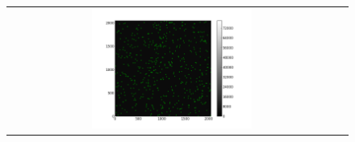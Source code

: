 \documentclass[letterpaper,12pt]{article}
\begin{document}
\begin{figure}[h!]
\begin{tabular}{cc}
                                                                                                                                                                                                                                                                                                                                                                                                                                                                                                                                                                                                                                                                                                                                                                                                                                   \includegraphics[width=0.5\textwidth]{maximas_20.png} 

\end{tabular}
\end{figure}
\end{document}
